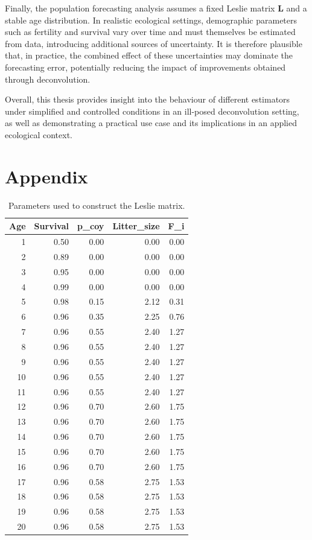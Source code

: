 \documentclass[11pt,a4paper]{article}
\begin{document}
Finally, the population forecasting analysis assumes a fixed Leslie matrix $\mathbf{L}$ and a stable age distribution. In realistic ecological settings, demographic parameters such as fertility and survival vary over time and must themselves be estimated from data, introducing additional sources of uncertainty. It is therefore plausible that, in practice, the combined effect of these uncertainties may dominate the forecasting error, potentially reducing the impact of improvements obtained through deconvolution.

Overall, this thesis provides insight into the behaviour of different estimators under simplified and controlled conditions in an ill-posed deconvolution setting, as well as demonstrating a practical use case and its implications in an applied ecological context.
 



\section{Appendix}

\label{app:leslie_params}

\begin{table}[ht]
	\centering
	\caption{Parameters used to construct the Leslie matrix.}
	\label{tab:leslie_params}
\begin{tabular}{rrrrr}
	\hline
	Age & Survival & p\_coy & Litter\_size & F\_i \\ 
	\hline
	1 & 0.50 & 0.00 & 0.00 & 0.00 \\ 
	2 & 0.89 & 0.00 & 0.00 & 0.00 \\ 
	3 & 0.95 & 0.00 & 0.00 & 0.00 \\ 
	4 & 0.99 & 0.00 & 0.00 & 0.00 \\ 
	5 & 0.98 & 0.15 & 2.12 & 0.31 \\ 
	6 & 0.96 & 0.35 & 2.25 & 0.76 \\ 
	7 & 0.96 & 0.55 & 2.40 & 1.27 \\ 
	8 & 0.96 & 0.55 & 2.40 & 1.27 \\ 
	9 & 0.96 & 0.55 & 2.40 & 1.27 \\ 
	10 & 0.96 & 0.55 & 2.40 & 1.27 \\ 
	11 & 0.96 & 0.55 & 2.40 & 1.27 \\ 
	12 & 0.96 & 0.70 & 2.60 & 1.75 \\ 
	13 & 0.96 & 0.70 & 2.60 & 1.75 \\ 
	14 & 0.96 & 0.70 & 2.60 & 1.75 \\ 
	15 & 0.96 & 0.70 & 2.60 & 1.75 \\ 
	16 & 0.96 & 0.70 & 2.60 & 1.75 \\ 
	17 & 0.96 & 0.58 & 2.75 & 1.53 \\ 
	18 & 0.96 & 0.58 & 2.75 & 1.53 \\ 
	19 & 0.96 & 0.58 & 2.75 & 1.53 \\ 
	20 & 0.96 & 0.58 & 2.75 & 1.53 \\ 
	\hline
\end{tabular}
\end{table}
\end{document}

